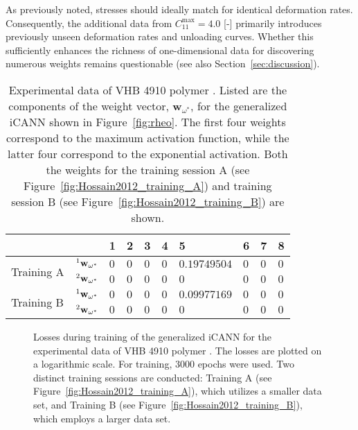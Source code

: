 As previously noted, stresses should ideally match for identical deformation rates. 
Consequently, the additional data from $ C_{11}^{\text{max}} = 4.0 $ [-] primarily introduces previously unseen deformation rates and unloading curves. 
Whether this sufficiently enhances the richness of one-dimensional data for discovering numerous weights remains questionable (see also Section~\ref{sec:discussion}).
%
\begin{table}[t]
    \centering
        \begin{tabular}{l l | l l l l l l l l}
                &    &   1   &   2   &   3   &   4   &   5   &   6   &   7   &   8 \\
            \hline
            \multirow{2}{*}{Training A}  & $\prescript{1}{}{}\mathbf{w}_{\omega^*}$ & $0$ & $0$ & $0$ & $0$ & $0.19749504$ & $0$ & $0$ & $0$ \\
                                    & $\prescript{2}{}{}\mathbf{w}_{\omega^*}$ & $0$ & $0$ & $0$ & $0$ & $0$ & $0$ & $0$ & $0$ \\
            \hline
            \multirow{2}{*}{Training B}  & $\prescript{1}{}{}\mathbf{w}_{\omega^*}$ & $0$ & $0$ & $0$ & $0$ & $0.09977169$ & $0$ & $0$ & $0$ \\
                                    & $\prescript{2}{}{}\mathbf{w}_{\omega^*}$ & $0$ & $0$ & $0$ & $0$ & $0$ & $0$ & $0$ & $0$                                    
        \end{tabular}
    \caption{Experimental data of VHB 4910 polymer \cite{hossain2012}. Listed are the components of the weight vector, $\mathbf{w}_{\omega^*}$, for the generalized iCANN shown in Figure~\ref{fig:rheo}. The first four weights correspond to the maximum activation function, while the latter four correspond to the exponential activation. Both the weights for the training session A (see Figure~\ref{fig:Hossain2012_training_A}) and training session B (see Figure~\ref{fig:Hossain2012_training_B}) are shown.}
    \label{tab:w_pot_Hossain2012}
\end{table}
%
\begin{figure}[h]
    \centering
    
    \caption{Losses during training of the generalized iCANN for the experimental data of VHB 4910 polymer \cite{hossain2012}. The losses are plotted on a logarithmic scale. For training, $3000$ epochs were used. Two distinct training sessions are conducted: Training A (see Figure~\ref{fig:Hossain2012_training_A}), which utilizes a smaller data set, and Training B (see Figure~\ref{fig:Hossain2012_training_B}), which employs a larger data set.}
    \label{fig:Hossain2012_losses}
\end{figure}
